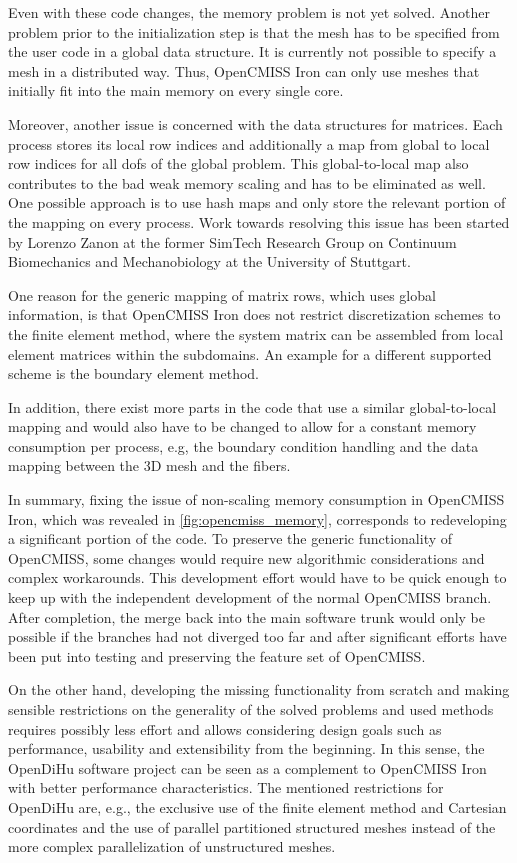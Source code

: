 Even with these code changes, the memory problem is not yet solved. Another problem prior to the initialization step is that the mesh has to be specified from the user code in a global data structure. It is currently not possible to specify a mesh in a distributed way. Thus, OpenCMISS Iron can only use meshes that initially fit into the main memory on every single core.

Moreover, another issue is concerned with the data structures for matrices. Each process stores its local row indices and additionally a map from global to local row indices for all dofs of the global problem. This global-to-local map also contributes to the bad weak memory scaling and has to be eliminated as well. One possible approach is to use hash maps and only store the relevant portion of the mapping on every process. Work towards resolving this issue has been started by Lorenzo Zanon at the former SimTech Research Group on Continuum Biomechanics and Mechanobiology at the University of Stuttgart. 

One reason for the generic mapping of matrix rows, which uses global information, is that OpenCMISS Iron does not restrict discretization schemes to the finite element method, where the system matrix can be assembled from local element matrices within the subdomains. An example for a different supported scheme is the boundary element method.

In addition, there exist more parts in the code that use a similar global-to-local mapping and would also have to be changed to allow for a constant memory consumption per process, e.g, the boundary condition handling and the data mapping between the 3D mesh and the fibers.

In summary, fixing the issue of non-scaling memory consumption in OpenCMISS Iron, which was revealed in \cref{fig:opencmiss_memory}, corresponds to redeveloping a significant portion of the code. 
To preserve the generic functionality of OpenCMISS, some changes would require new algorithmic considerations and complex workarounds.
This development effort would have to be quick enough to keep up with the independent development of the normal OpenCMISS branch. After completion, the merge back into the main software trunk would only be possible if the branches had not diverged too far and after significant efforts have been put into testing and preserving the feature set of OpenCMISS.

On the other hand, developing the missing functionality from scratch and making sensible restrictions on the generality of the solved problems and used methods requires possibly less effort and allows considering design goals such as performance, usability and extensibility from the beginning.
In this sense, the OpenDiHu software project can be seen as a complement to OpenCMISS Iron with better performance characteristics.  %
The mentioned restrictions for OpenDiHu are, e.g., the exclusive use of the finite element method and Cartesian coordinates and the use of parallel partitioned structured meshes instead of the more complex parallelization of unstructured meshes.

